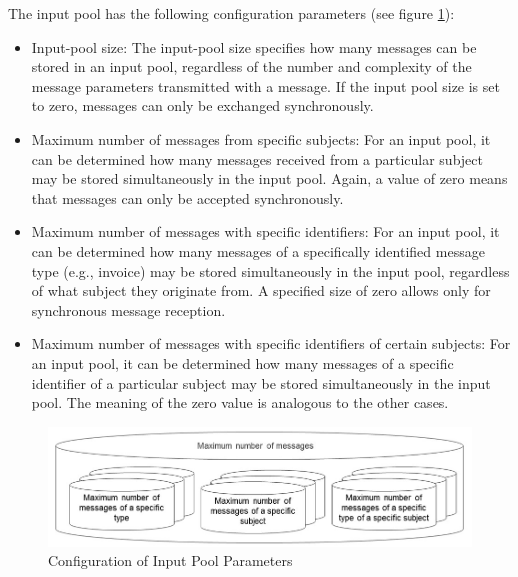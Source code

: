 The input pool has the following configuration parameters (see figure \ref{fig:input-pool}):\
\begin{itemize}
	\item Input-pool size: The input-pool size specifies how many messages can be stored in an input pool, regardless of the number and complexity of the message parameters transmitted with a message. If the input pool size is set to zero, messages can only be exchanged synchronously.
	\item Maximum number of messages from specific subjects: For an input pool, it can be determined how many messages received from a particular subject may be stored simultaneously in the input pool. Again, a value of zero means that messages can only be accepted synchronously.
	\item Maximum number of messages with specific identifiers: For an input pool, it can be determined how many messages of a specifically identified message type (e.g., invoice) may be stored simultaneously in the input pool, regardless of what subject they originate from. A specified size of zero allows only for synchronous message reception.
	\item Maximum number of messages with specific identifiers of certain subjects: For an input pool, it can be determined how many messages of a specific identifier of a particular subject may be stored simultaneously in the input pool. The meaning of the zero value is analogous to the other cases.
\end{itemize}
\newpage
\begin{figure}[ph]
	\centering
	\includegraphics[width=12cm]{20181026-Ontologie-Bilder/Grafiken-Ontologie/SUbject-Interaction/input-pool-informal.jpg}
	\caption[Input Pool]{Configuration of Input Pool Parameters}
	\label{fig:input-pool}
\end{figure}


